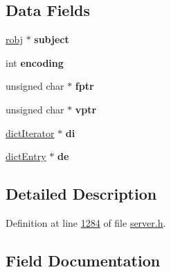 \subsection*{Data Fields}
\begin{DoxyCompactItemize}
\item 
\mbox{\label{structhashTypeIterator_af6292b220bff1b4e07c3e5e1a81a93eb}} 
\hyperlink{structredisObject}{robj} $\ast$ {\bfseries subject}
\item 
\mbox{\label{structhashTypeIterator_a4511142a32f206a5800c01836a849a69}} 
int {\bfseries encoding}
\item 
\mbox{\label{structhashTypeIterator_ae244f0db1d25dcb36626cc0166604b29}} 
unsigned char $\ast$ {\bfseries fptr}
\item 
\mbox{\label{structhashTypeIterator_ae3bfaea89400c690dc432787e212f6df}} 
unsigned char $\ast$ {\bfseries vptr}
\item 
\mbox{\label{structhashTypeIterator_a1159f51a564f49bf545b47b2f53a5934}} 
\hyperlink{structdictIterator}{dict\+Iterator} $\ast$ {\bfseries di}
\item 
\mbox{\label{structhashTypeIterator_aa5ab070f2c3e939023bc4bc8aa10d148}} 
\hyperlink{structdictEntry}{dict\+Entry} $\ast$ {\bfseries de}
\end{DoxyCompactItemize}


\subsection{Detailed Description}


Definition at line \hyperlink{server_8h_source_l01284}{1284} of file \hyperlink{server_8h_source}{server.\+h}.



\subsection{Field Documentation}
\mbox{\label{structhashTypeIterator_aa5ab070f2c3e939023bc4bc8aa10d148}} 
